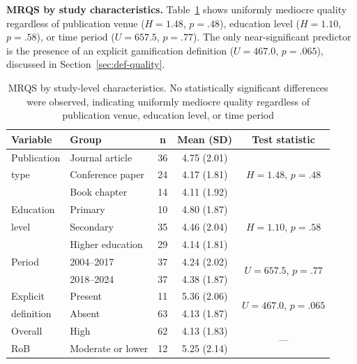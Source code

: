\textbf{MRQS by study characteristics.} \label{sec:mrqs-by-characteristics} Table~\ref{tab:mrqs-groups} shows uniformly mediocre quality regardless of publication venue ($H = 1.48$, $p = .48$), education level ($H = 1.10$, $p = .58$), or time period ($U = 657.5$, $p = .77$). The only near-significant predictor is the presence of an explicit gamification definition ($U = 467.0$, $p = .065$), discussed in Section~\ref{sec:def-quality}.

\begin{table}[!h]
\centering
\caption{MRQS by study-level characteristics. No statistically significant differences were observed, indicating uniformly mediocre quality regardless of publication venue, education level, or time period}
\label{tab:mrqs-groups}
\small
\begin{tabular}{llccc}
\hline
\textbf{Variable} & \textbf{Group} & \textbf{n} & \textbf{Mean (SD)} & \textbf{Test statistic} \\
\hline
Publication & Journal article & 36 & 4.75 (2.01) & \multirow{3}{*}{$H = 1.48$, $p = .48$} \\
type & Conference paper & 24 & 4.17 (1.81) & \\
 & Book chapter & 14 & 4.11 (1.92) & \\
\hline
Education & Primary & 10 & 4.80 (1.87) & \multirow{3}{*}{$H = 1.10$, $p = .58$} \\
level & Secondary & 35 & 4.46 (2.04) & \\
 & Higher education & 29 & 4.14 (1.81) & \\
\hline
Period & 2004--2017 & 37 & 4.24 (2.02) & \multirow{2}{*}{$U = 657.5$, $p = .77$} \\
 & 2018--2024 & 37 & 4.38 (1.87) & \\
\hline
Explicit & Present & 11 & 5.36 (2.06) & \multirow{2}{*}{$U = 467.0$, $p = .065$} \\
definition & Absent & 63 & 4.13 (1.87) & \\
\hline
Overall & High & 62 & 4.13 (1.83) & \multirow{2}{*}{---} \\
RoB & Moderate or lower & 12 & 5.25 (2.14) & \\
\hline
\end{tabular}
\end{table}

